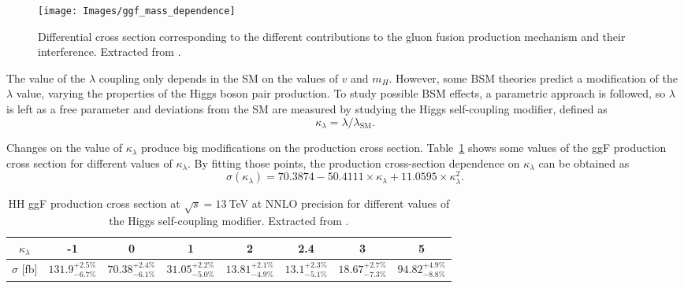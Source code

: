 \documentclass[../main.tex]{subfiles}
\begin{document}
\begin{figure}[h!]
\begin{center}
\texttt{[image: Images/ggf\_mass\_dependence]}
\end{center}
\caption[Gluon fusion differential cross section]{Differential cross section corresponding to the different contributions to the gluon fusion production mechanism and their interference. Extracted from \cite{intro:theo:higgs_potential}.}
\label{theo:fig:ggf_mass_dependence}
\end{figure}

The value of the $\lambda$ coupling only depends in the SM on the values of $v$ and $m_H$. However, some BSM theories predict a modification of the $\lambda$ value, varying the properties of the Higgs boson pair production. To study possible BSM effects, a parametric approach is followed, so $\lambda$ is left as a free parameter and deviations from the SM are measured by studying the Higgs self-coupling modifier, defined as
\begin{equation}
\kappa_\lambda = \lambda / \lambda_{\text{SM}}.
\end{equation}

Changes on the value of $\kappa_\lambda$ produce big modifications on the production cross section. Table~\ref{theo:tab:ggf_kl_dependence} shows some values of the ggF production cross section for different values of $\kappa_\lambda$. By fitting those points, the production cross-section dependence on $\kappa_\lambda$ can be obtained as
\begin{equation}
\sigma(\kappa_\lambda) = 70.3874 - 50.4111 \times \kappa_\lambda + 11.0595 \times \kappa_\lambda^2.
\end{equation}

\begin{table}[h!]
\begin{center}
\begin{footnotesize}
\begin{tabular}{c | c | c | c | c | c | c | c}
$\kappa_\lambda$ & -1 & 0 & 1 & 2 & 2.4 & 3 & 5 \\\hline\hline
$\sigma$ [fb] & $131.9^{+2.5\%}_{-6.7\%}$ & $70.38^{+2.4\%}_{-6.1\%}$ & $31.05^{+2.2\%}_{-5.0\%} $ & $13.81^{+2.1\%}_{-4.9\%}$ & $13.1^{+2.3\%}_{-5.1\%}$ & $18.67^{+2.7\%}_{-7.3\%}$ & $94.82^{+4.9\%}_{-8.8\%}$
\end{tabular}
\end{footnotesize}
\end{center}
\caption[HH ggF production cross section]{HH ggF production cross section at $\sqrt{s}=13~$TeV at NNLO precision for different values of the Higgs self-coupling modifier. Extracted from \cite{intro:theo:les_houches}.}
\label{theo:tab:ggf_kl_dependence}
\end{table}
\end{document}
